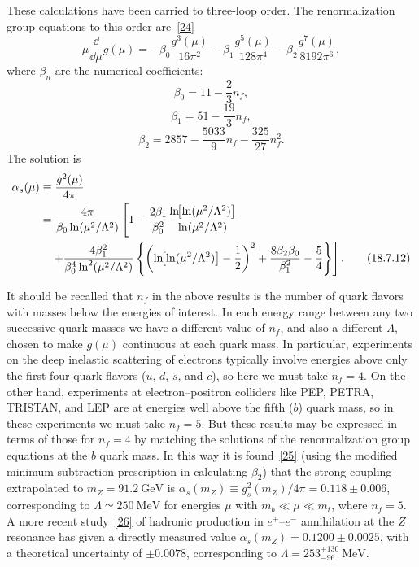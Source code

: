 These calculations have been carried to three-loop order. The renormalization group equations to this order are~\hyperref[ch18-ref-24]{[24]}
\begin{equation}
\mu\frac{\dd}{\dd\mu}g(\mu)
=-\beta_0\frac{g^3(\mu)}{16\pi^2}
-\beta_1\frac{g^5(\mu)}{128\pi^4}
-\beta_2\frac{g^7(\mu)}{8192\pi^6},
\tag{18.7.8}\label{eq:18.7.8}
\end{equation}
where $\beta_n$ are the numerical coefficients:
\begin{equation}
\beta_0=11-\frac{2}{3}n_f,
\tag{18.7.9}\label{eq:18.7.9}
\end{equation}
\begin{equation}
\beta_1=51-\frac{19}{3}n_f,
\tag{18.7.10}\label{eq:18.7.10}
\end{equation}
\begin{equation}
\beta_2=2857-\frac{5033}{9}n_f-\frac{325}{27}n_f^2.
\tag{18.7.11}\label{eq:18.7.11}
\end{equation}
The solution is
\begin{align}
\alpha_s(\mu)&\equiv\frac{g^2(\mu)}{4\pi}\notag\\
&=\frac{4\pi}{\beta_0\ln(\mu^2/\Lambda^2)}
\left[1-\frac{2\beta_1}{\beta_0^2}
\frac{\ln\!\bigl[\ln(\mu^2/\Lambda^2)\bigr]}{\ln(\mu^2/\Lambda^2)}\right.\notag\\
&\quad\left.+\frac{4\beta_1^2}{\beta_0^4\ln^2(\mu^2/\Lambda^2)}
\left\{\left(\ln\!\bigl[\ln(\mu^2/\Lambda^2)\bigr]-\frac{1}{2}\right)^2
+\frac{8\beta_2\beta_0}{\beta_1^2}-\frac{5}{4}\right\}\right].
\tag{18.7.12}\label{eq:18.7.12}
\end{align}

It should be recalled that $n_f$ in the above results is the number of quark flavors with masses below the energies of interest. In each energy range between any two successive quark masses we have a different value of $n_f$, and also a different $\Lambda$, chosen to make $g(\mu)$ continuous at each quark mass. In particular, experiments on the deep inelastic scattering of electrons typically involve energies above only the first four quark flavors ($u$, $d$, $s$, and $c$), so here we must take $n_f=4$. On the other hand, experiments at electron--positron colliders like PEP, PETRA, TRISTAN, and LEP are at energies well above the fifth ($b$) quark mass, so in these experiments we must take $n_f=5$. But these results may be expressed in terms of those for $n_f=4$ by matching the solutions of the renormalization group equations at the $b$ quark mass. In this way it is found~\hyperref[ch18-ref-25]{[25]} (using the modified minimum subtraction prescription in calculating $\beta_2$) that the strong coupling extrapolated to $m_Z=91.2\ \mathrm{GeV}$ is $\alpha_s(m_Z)\equiv g_s^2(m_Z)/4\pi=0.118\pm0.006$, corresponding to $\Lambda\simeq250\ \mathrm{MeV}$ for energies $\mu$ with $m_b\ll\mu\ll m_t$, where $n_f=5$. A more recent study~\hyperref[ch18-ref-26]{[26]} of hadronic production in $e^+$--$e^-$ annihilation at the $Z$ resonance has given a directly measured value $\alpha_s(m_Z)=0.1200\pm0.0025$, with a theoretical uncertainty of $\pm0.0078$, corresponding to $\Lambda=253^{+130}_{-96}\ \mathrm{MeV}$.
